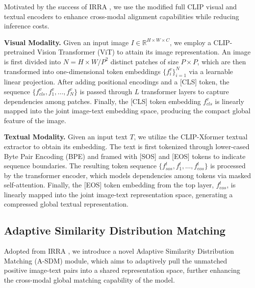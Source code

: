 \documentclass[acmsmall]{acmart}
\begin{document}
Motivated by the success of IRRA \cite{jiang2023cross}, we use the
modified full CLIP \cite{radford2021learning} visual and textual
encoders to enhance cross-modal alignment capabilities while
reducing inference costs.

{\bfseries Visual Modality.} Given an input image $I \in
\mathbb{R}^{H \times W \times C}$, we employ a CLIP-pretrained
Vision Transformer (ViT) to attain its image representation. An
image is first divided into $N = H \times W / P^2$ distinct patches
of size $P \times P$, which are then transformed into
one-dimensional token embeddings $\{f_i^v\}_{i=1}^N$ via a learnable
linear projection. After adding positional encodings and a [CLS]
token, the sequence $\{f_{cls}^v, f_1^v, \dots, f_N^v\}$ is passed
through $L$ transformer layers to capture dependencies among
patches. Finally, the [CLS] token embedding $f_{cls}^v$ is linearly
mapped into the joint image-text embedding space, producing the
compact global feature of the image.

{\bfseries Textual Modality.} Given an input text $T$, we utilize
the CLIP-Xformer textual extractor \cite{radford2021learning} to
obtain its embedding. The text is first tokenized through
lower-cased Byte Pair Encoding (BPE) \cite{sennrich2015neural} and
framed with [SOS] and [EOS] tokens to indicate sequence boundaries.
The resulting token sequence $\{f_{sos}^t, f_1^t, \dots,
f_{eos}^t\}$ is processed by the transformer encoder, which models
dependencies among tokens via masked self-attention. Finally, the
[EOS] token embedding from the top layer, $f_{eos}^t$, is linearly
mapped into the joint image-text representation space, generating a
compressed global textual representation.

\subsection{Adaptive Similarity Distribution Matching}

Adopted from IRRA \cite{jiang2023cross}, we introduce a novel
Adaptive Similarity Distribution Matching (A-SDM) module, which aims
to adaptively pull the unmatched positive image-text pairs into a
shared representation space, further enhancing the cross-modal global
matching capability of the model.
\end{document}
